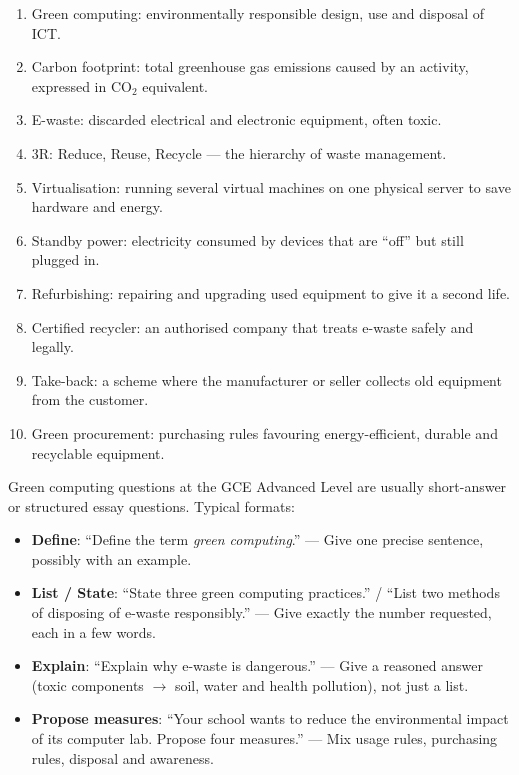 \documentclass[11pt]{article}
\newcommand{\cle}[1]{{\popxbold\color{popdark}#1}}
\newcounter{popsec}
\newcounter{popsub}
\newcommand{\courssub}[1]{%
  \stepcounter{popsub}%
  \par\vspace{9pt}\noindent{\popxbold\fontsize{11.5}{13}\selectfont\color{popink}{\color{poporange}\thepopsec.\thepopsub}\hspace{6pt}#1}\par\nopagebreak\vspace{4pt}
}
\begin{document}
\begin{aretenir}
\begin{enumerate}
\item \cle{Green computing}: environmentally responsible design, use and disposal of ICT.
\item \cle{Carbon footprint}: total greenhouse gas emissions caused by an activity, expressed in CO$_2$ equivalent.
\item \cle{E-waste}: discarded electrical and electronic equipment, often toxic.
\item \cle{3R}: Reduce, Reuse, Recycle — the hierarchy of waste management.
\item \cle{Virtualisation}: running several virtual machines on one physical server to save hardware and energy.
\item \cle{Standby power}: electricity consumed by devices that are ``off'' but still plugged in.
\item \cle{Refurbishing}: repairing and upgrading used equipment to give it a second life.
\item \cle{Certified recycler}: an authorised company that treats e-waste safely and legally.
\item \cle{Take-back}: a scheme where the manufacturer or seller collects old equipment from the customer.
\item \cle{Green procurement}: purchasing rules favouring energy-efficient, durable and recyclable equipment.
\end{enumerate}
\end{aretenir}

\courssub{GCE Examination Preparation}

Green computing questions at the GCE Advanced Level are usually short-answer or structured essay questions. Typical formats:

\begin{itemize}
\item \textbf{Define}: ``Define the term \emph{green computing}.'' — Give one precise sentence, possibly with an example.
\item \textbf{List / State}: ``State three green computing practices.'' / ``List two methods of disposing of e-waste responsibly.'' — Give exactly the number requested, each in a few words.
\item \textbf{Explain}: ``Explain why e-waste is dangerous.'' — Give a reasoned answer (toxic components $\to$ soil, water and health pollution), not just a list.
\item \textbf{Propose measures}: ``Your school wants to reduce the environmental impact of its computer lab. Propose four measures.'' — Mix usage rules, purchasing rules, disposal and awareness.
\end{itemize}
\end{document}
